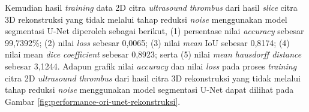 \begin{enumerate}
	Kemudian hasil \textit{training} data 2D citra \textit{ultrasound} \textit{thrombus} dari hasil \textit{slice} citra 3D rekonstruksi yang tidak melalui tahap reduksi \textit{noise} menggunakan model segmentasi U-Net diperoleh sebagai berikut, (1) persentase nilai \textit{accuracy} sebesar 99,7392\%; (2) nilai \textit{loss} sebesar 0,0065; (3) nilai \textit{mean} IoU sebesar 0,8174; (4) nilai mean \textit{dice coefficient} sebesar 0,8923; serta (5) nilai \textit{mean hausdorff distance} sebesar 3,1244. Adapun grafik nilai \textit{accuracy} dan nilai \textit{loss} pada proses \textit{training} citra 2D \textit{ultrasound} \textit{thrombus} dari hasil citra 3D rekonstruksi yang tidak melalui tahap reduksi \textit{noise} menggunakan model segmentasi U-Net dapat dilihat pada Gambar \ref{fig:performance-ori-unet-rekonstruksi}.
	

\end{enumerate}

